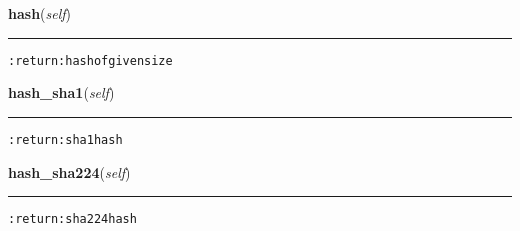     \vspace{0.5ex}

\hspace{.8\funcindent}\begin{boxedminipage}{\funcwidth}

    \raggedright \textbf{hash}(\textit{self})

    \vspace{-1.5ex}

    \rule{\textwidth}{0.5\fboxrule}
\setlength{\parskip}{2ex}
\begin{alltt}

:return: hash of given size
\end{alltt}

\setlength{\parskip}{1ex}
    \end{boxedminipage}

    \label{hal:maths:crypt:SHA:hash_sha1}

    \vspace{0.5ex}

\hspace{.8\funcindent}\begin{boxedminipage}{\funcwidth}

    \raggedright \textbf{hash\_sha1}(\textit{self})

    \vspace{-1.5ex}

    \rule{\textwidth}{0.5\fboxrule}
\setlength{\parskip}{2ex}
\begin{alltt}

:return: sha1 hash
\end{alltt}

\setlength{\parskip}{1ex}
    \end{boxedminipage}

    \label{hal:maths:crypt:SHA:hash_sha224}

    \vspace{0.5ex}

\hspace{.8\funcindent}\begin{boxedminipage}{\funcwidth}

    \raggedright \textbf{hash\_sha224}(\textit{self})

    \vspace{-1.5ex}

    \rule{\textwidth}{0.5\fboxrule}
\setlength{\parskip}{2ex}
\begin{alltt}

:return: sha224 hash
\end{alltt}

\setlength{\parskip}{1ex}
    \end{boxedminipage}

